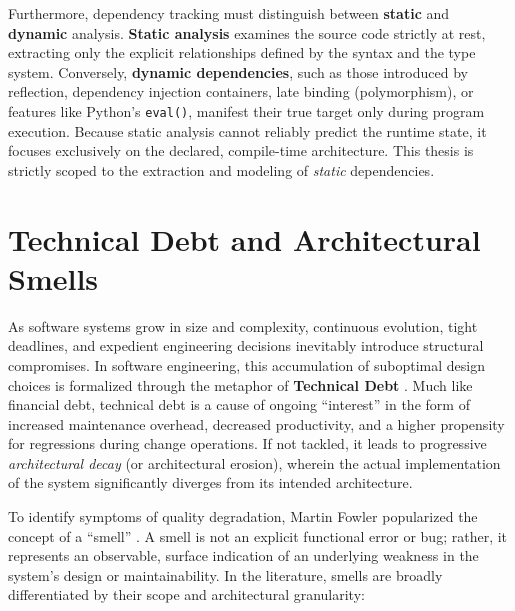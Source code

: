 Furthermore, dependency tracking must distinguish between
\textbf{static} and \textbf{dynamic} analysis. \textbf{Static
analysis} examines the source code strictly at rest, extracting only
the explicit relationships defined by the syntax and the type system.
Conversely, \textbf{dynamic dependencies}, such as those introduced
by reflection, dependency injection containers, late binding
(polymorphism), or features like Python's \texttt{eval()}, manifest
their true target only during program execution. Because static analysis cannot
reliably predict the runtime state, it focuses exclusively on the
declared, compile-time architecture. This thesis is strictly scoped
to the extraction and modeling of \textit{static} dependencies.

\section{Technical Debt and Architectural Smells}
\label{sec:architectural_smells}
\label{sec:smells}

As software systems grow in size and complexity, continuous evolution,
tight deadlines, and expedient engineering decisions inevitably introduce
structural compromises. In software engineering, this accumulation of
suboptimal design choices is formalized through the metaphor of
\textbf{Technical Debt} \cite{cunningham_wycash_1992, kruchten_technical_2012}.
Much like financial debt, technical debt is a cause of ongoing
``interest'' in the
form of increased maintenance overhead, decreased productivity, and a higher
propensity for regressions during change operations. If not tackled, it
leads to progressive \textit{architectural decay} (or architectural erosion),
wherein the actual implementation of the system significantly diverges from
its intended architecture.

To identify symptoms of quality degradation, Martin Fowler popularized the
concept of a ``smell'' \cite{fowler_refactoring_2013}. A smell is not an
explicit functional error or bug; rather, it represents an observable,
surface indication of an underlying weakness in the system's design or
maintainability. In the literature, smells are broadly differentiated by their
scope and architectural granularity:

